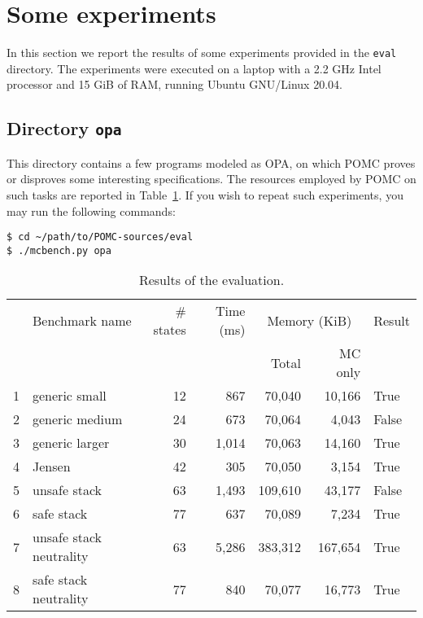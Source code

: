 \documentclass[9pt,a4paper]{article}
\begin{document}
\section{Some experiments}
\label{sec:exp}

In this section we report the results of some experiments
provided in the \texttt{eval} directory.
The experiments were executed on a laptop with a 2.2 GHz Intel processor
and 15 GiB of RAM, running Ubuntu GNU/Linux 20.04.


\subsection{Directory \texttt{opa}}
\label{sec:exp-opa}

This directory contains a few programs modeled as OPA,
on which POMC proves or disproves some interesting specifications.
The resources employed by POMC on such tasks are reported in Table~\ref{tab:eval}.
If you wish to repeat such experiments, you may run the following
commands:
\begin{verbatim}
$ cd ~/path/to/POMC-sources/eval
$ ./mcbench.py opa
\end{verbatim}

\begin{table}
  \centering
  \begin{tabular}{| r | l | r | r | r | r | l |}
    \hline
    & Benchmark name & \# states & Time (ms) & \multicolumn{2}{c|}{Memory (KiB)} & Result \\
    \cline{5-6}
    & & & & Total & MC only & \\
    \hline
    1 & generic small & 12 & 867 & 70,040 & 10,166 & True \\
    2 & generic medium & 24 & 673 & 70,064 & 4,043 & False \\
    3 & generic larger & 30 & 1,014 & 70,063 & 14,160 & True \\
    4 & Jensen & 42 & 305 & 70,050 & 3,154 & True \\
    5 & unsafe stack & 63 & 1,493 & 109,610 & 43,177 & False \\
    6 & safe stack & 77 & 637 & 70,089 & 7,234 & True \\
    7 & unsafe stack neutrality & 63 & 5,286 & 383,312 & 167,654 & True \\
    8 & safe stack neutrality & 77 & 840 & 70,077 & 16,773 & True \\
    \hline
  \end{tabular}
  \caption{Results of the evaluation.}
  \label{tab:eval}
\end{table}
\end{document}
